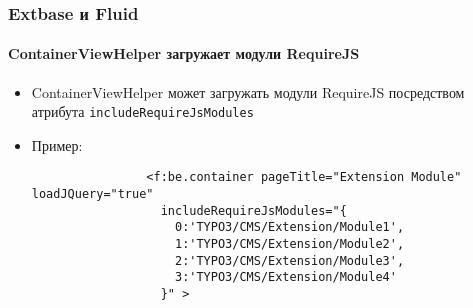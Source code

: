 
\begin{frame}[fragile]
	\frametitle{Extbase и Fluid}
	\framesubtitle{ContainerViewHelper загружает модули RequireJS}

	\begin{itemize}

		\item ContainerViewHelper может загружать модули RequireJS посредством атрибута \texttt{includeRequireJsModules}

		\item Пример:

			\begin{lstlisting}
				<f:be.container pageTitle="Extension Module" loadJQuery="true"
				  includeRequireJsModules="{
				    0:'TYPO3/CMS/Extension/Module1',
				    1:'TYPO3/CMS/Extension/Module2',
				    2:'TYPO3/CMS/Extension/Module3',
				    3:'TYPO3/CMS/Extension/Module4'
				  }" >
			\end{lstlisting}

	\end{itemize}

\end{frame}


